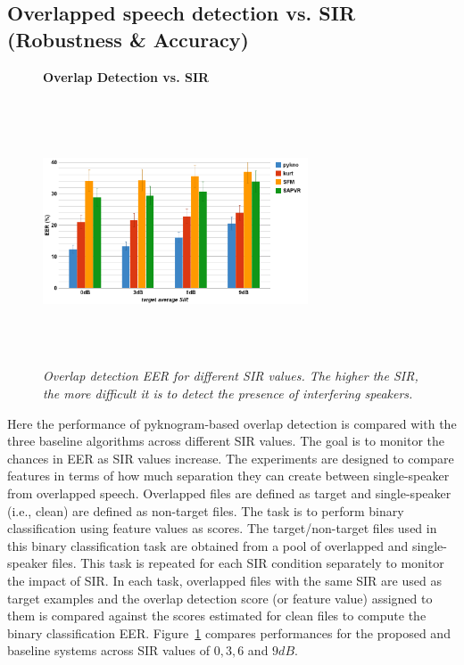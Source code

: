 {\subsection{Overlapped speech detection vs. SIR (Robustness \& Accuracy)}
\label{sssec:ovl_frame_vs_sir}
\begin{figure}[h!]
	\centering
	\hspace{-1mm}
	\textbf{Overlap Detection vs. SIR}\par\medskip
	\includegraphics[height = 3.1in, width=0.7\textwidth]{figures/ovldet_vs_sir}
	\vspace{-1mm}
	\caption{\it Overlap detection EER for different SIR values. The higher the SIR, the more difficult it is to detect the presence of interfering speakers.}
	\vspace{0mm}
	\label{fig:ovl_det}
\end{figure}
Here the performance of pyknogram-based overlap detection is compared with the three baseline algorithms across different SIR values. 
The goal is to monitor the chances in EER as SIR values increase. 
The experiments are designed to compare features in terms of how much separation they can create between single-speaker from overlapped speech. 
Overlapped files are defined as target and single-speaker (i.e., clean) are defined as non-target files. 
The task is to perform binary classification using feature values as scores. 
The target/non-target files used in this binary classification task are obtained from a pool of overlapped and single-speaker files. 
This task is repeated for each SIR condition separately to monitor the impact of SIR. 
In each task, overlapped files with the same SIR are used as target examples and the overlap detection score (or feature value) assigned to them is compared against the scores estimated for clean files to compute the binary classification EER. 
Figure~\ref{fig:ovl_det} compares performances for the proposed and baseline systems across SIR values of $0, 3, 6$ and $9dB$.


}
